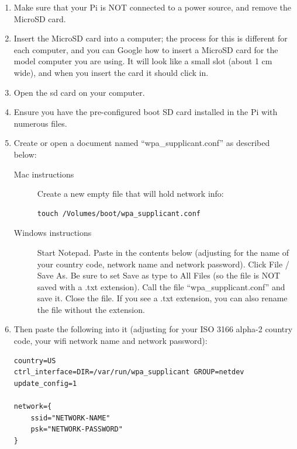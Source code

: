 \documentclass{article}\usepackage[]{graphicx}\usepackage[]{color}
\begin{document}
\begin{enumerate}

\item Make sure that your Pi is NOT connected to a power source, and remove the MicroSD card.

\item Insert the MicroSD card into a computer; the process for this is different for each computer, and you can Google how to insert a MicroSD card for the model computer you are using.  It will look like a small slot (about 1 cm wide), and when you insert the card it should click in.

\item Open the sd card on your computer. 

\item Ensure you have the pre-configured boot SD card installed in the Pi with numerous files.

\item Create or open a document named ``wpa\_supplicant.conf'' as described below:

\begin{description}
  \item[Mac instructions] Create a new empty file that will hold network info:

\begin{lstlisting}
touch /Volumes/boot/wpa_supplicant.conf
\end{lstlisting}

\item[Windows instructions] Start Notepad. Paste in the contents below (adjusting for the name of your country code, network name and network password). Click File / Save As. Be sure to set Save as type to All Files (so the file is NOT saved with a .txt extension). Call the file ``wpa\_supplicant.conf'' and save it.  Close the file. If you see a .txt extension, you can also rename the file without the extension. 
\end{description}

\item Then paste the following into it (adjusting for your ISO 3166 alpha-2 country code, your wifi network name and network password):

\begin{lstlisting}
country=US
ctrl_interface=DIR=/var/run/wpa_supplicant GROUP=netdev
update_config=1

network={
    ssid="NETWORK-NAME"
    psk="NETWORK-PASSWORD"
}
\end{lstlisting}


\end{enumerate}
\end{document}
